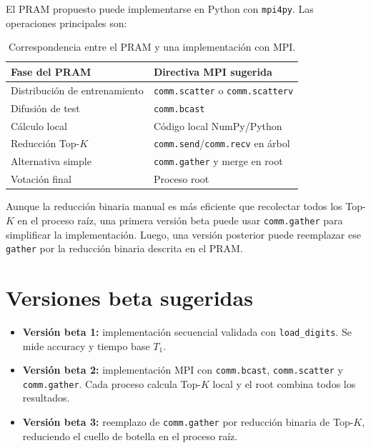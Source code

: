\documentclass[11pt,a4paper]{article}
\begin{document}
El PRAM propuesto puede implementarse en Python con \texttt{mpi4py}. Las operaciones principales
son:

\begin{table}[H]
\centering
\begin{tabular}{ll}
\toprule
Fase del PRAM & Directiva MPI sugerida \\
\midrule
Distribución de entrenamiento & \texttt{comm.scatter} o \texttt{comm.scatterv} \\
Difusión de test & \texttt{comm.bcast} \\
Cálculo local & Código local NumPy/Python \\
Reducción Top-$K$ & \texttt{comm.send}/\texttt{comm.recv} en árbol \\
Alternativa simple & \texttt{comm.gather} y merge en root \\
Votación final & Proceso root \\
\bottomrule
\end{tabular}
\caption{Correspondencia entre el PRAM y una implementación con MPI.}
\end{table}

Aunque la reducción binaria manual es más eficiente que recolectar todos los Top-$K$ en el
proceso raíz, una primera versión beta puede usar \texttt{comm.gather} para simplificar la
implementación. Luego, una versión posterior puede reemplazar ese \texttt{gather} por la reducción
binaria descrita en el PRAM.

\section{Versiones beta sugeridas}

\begin{itemize}
    \item \textbf{Versión beta 1:} implementación secuencial validada con \texttt{load\_digits}.
    Se mide accuracy y tiempo base $T_1$.
    
    \item \textbf{Versión beta 2:} implementación MPI con \texttt{comm.bcast}, \texttt{comm.scatter}
    y \texttt{comm.gather}. Cada proceso calcula Top-$K$ local y el root combina todos los
    resultados.
    
    \item \textbf{Versión beta 3:} reemplazo de \texttt{comm.gather} por reducción binaria de
    Top-$K$, reduciendo el cuello de botella en el proceso raíz.
\end{itemize}
\end{document}
